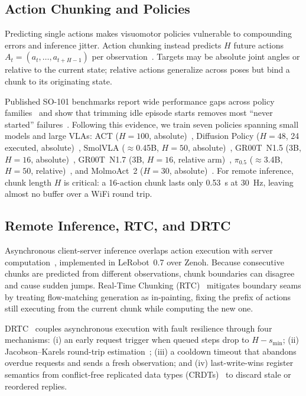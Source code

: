 \documentclass[conference]{IEEEtran}
\newcommand{\drtc}{DRTC}
\newcommand{\smolvla}{SmolVLA}
\newcommand{\groot}{GR00T~N1.5}
\newcommand{\pizerofive}{$\pi_{0.5}$}
\begin{document}
\subsection{Action Chunking and Policies}

Predicting single actions makes visuomotor policies vulnerable to compounding errors and inference jitter. Action chunking instead predicts $H$ future actions $A_t = (a_t,\dots,a_{t+H-1})$ per observation~\cite{zhao2023act}. Targets may be absolute joint angles or relative to the current state; relative actions generalize across poses but bind a chunk to its originating state.

Published SO-101 benchmarks report wide performance gaps across policy families~\cite{armnetbench,so101failure,valloss2026} and show that trimming idle episode starts removes most ``never started'' failures~\cite{valloss2026}. Following this evidence, we train seven policies spanning small models and large VLAs: ACT ($H=100$, absolute)~\cite{zhao2023act}, Diffusion Policy ($H=48$, 24 executed, absolute)~\cite{chi2023diffusion}, \smolvla{} ($\approx$0.45B, $H=50$, absolute)~\cite{shukor2025smolvla}, \groot{} (3B, $H=16$, absolute)~\cite{nvidia2025gr00t}, GR00T~N1.7 (3B, $H=16$, relative arm)~\cite{nvidia2025gr00t}, \pizerofive{} ($\approx$3.4B, $H=50$, relative)~\cite{pi2025pi05}, and MolmoAct~2 ($H=30$, absolute)~\cite{molmoact2}. For remote inference, chunk length $H$ is critical: a 16-action chunk lasts only 0.53~s at 30~Hz, leaving almost no buffer over a WiFi round trip.

\subsection{Remote Inference, RTC, and DRTC}

Asynchronous client-server inference overlaps action execution with server computation~\cite{shukor2025smolvla}, implemented in LeRobot~0.7 over Zenoh. Because consecutive chunks are predicted from different observations, chunk boundaries can disagree and cause sudden jumps. Real-Time Chunking (RTC)~\cite{black2025rtc} mitigates boundary seams by treating flow-matching generation as in-painting, fixing the prefix of actions still executing from the current chunk while computing the new one.

\drtc{}~\cite{vial2026drtc} couples asynchronous execution with fault resilience through four mechanisms: (i) an early request trigger when queued steps drop to $H - s_{\min}$; (ii) Jacobson--Karels round-trip estimation~\cite{jacobson1988congestion,rfc6298}; (iii) a cooldown timeout that abandons overdue requests and sends a fresh observation; and (iv) last-write-wins register semantics from conflict-free replicated data types (CRDTs)~\cite{shapiro2011crdt} to discard stale or reordered replies.
\end{document}
